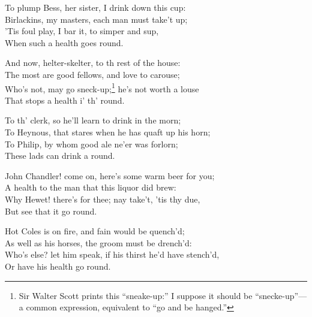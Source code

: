 \settowidth{\versewidth}{The most are good fellows, and love to carouse;}
\begin{dcverse}
\begin{patverse}
To plump Bess, her sister, I drink down this cup:\\
Birlackins, my masters, each man must take’t up;\\
’Tis foul play, I bar it, to simper and sup,\\
When such a health goes round.
\end{patverse}

\begin{patverse}
And now, helter-skelter, to th rest of the house:\\
The most are good fellows, and love to carouse;\\
Who’s not, may go sneck-up;\footnote{\textit{}
Sir Walter Scott prints this “sneake-up:” I suppose
it should be “snecke-up”—a common expression,
equivalent to “go and be hanged.”}
 he’s not worth a louse\\
That stops a health i’ th’ round.
\end{patverse}

\begin{patverse}
To th’ clerk, so he’ll learn to drink in the morn;\\
To Heynous, that stares when he has quaft up his horn;\\
To Philip, by whom good ale ne’er was forlorn;\\
These lads can drink a round.
\end{patverse}

\begin{patverse}
John Chandler! come on, here’s some warm beer for you;\\
A health to the man that this liquor did brew:\\
Why Hewet! there’s for thee; nay take’t, ’tis thy due,\\
But see that it go round.
\end{patverse}

\begin{patverse}
Hot Coles is on fire, and fain would be quench’d;\\
As well as his horses, the groom must be drench’d:\\
Who’s else? let him speak, if his thirst he’d have stench’d,\\
Or have his health go round.
\end{patverse}


\end{dcverse}
